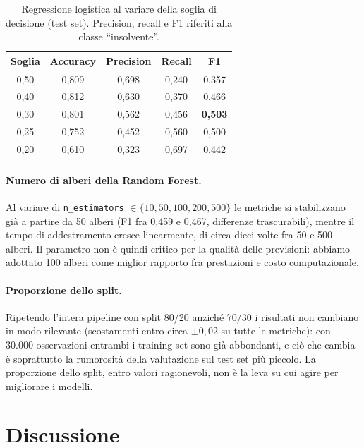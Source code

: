 \documentclass[11pt,a4paper]{article}
\begin{document}
\begin{table}[H]
\centering
\caption{Regressione logistica al variare della soglia di decisione (test set). Precision, recall e F1 riferiti alla classe ``insolvente''.}
\label{tab:soglie}
\begin{tabular}{ccccc}
\toprule
\textbf{Soglia} & \textbf{Accuracy} & \textbf{Precision} & \textbf{Recall} & \textbf{F1} \\
\midrule
0,50 & 0,809 & 0,698 & 0,240 & 0,357 \\
0,40 & 0,812 & 0,630 & 0,370 & 0,466 \\
0,30 & 0,801 & 0,562 & 0,456 & \textbf{0,503} \\
0,25 & 0,752 & 0,452 & 0,560 & 0,500 \\
0,20 & 0,610 & 0,323 & 0,697 & 0,442 \\
\bottomrule
\end{tabular}
\end{table}

\paragraph{Numero di alberi della Random Forest.} Al variare di \texttt{n\_estimators} $\in \{10, 50, 100, 200, 500\}$ le metriche si stabilizzano gi\`a a partire da 50 alberi (F1 fra 0,459 e 0,467, differenze trascurabili), mentre il tempo di addestramento cresce linearmente, di circa dieci volte fra 50 e 500 alberi. Il parametro non \`e quindi critico per la qualit\`a delle previsioni: abbiamo adottato 100 alberi come miglior rapporto fra prestazioni e costo computazionale.

\paragraph{Proporzione dello split.} Ripetendo l'intera pipeline con split 80/20 anzich\'e 70/30 i risultati non cambiano in modo rilevante (scostamenti entro circa $\pm 0{,}02$ su tutte le metriche): con 30.000 osservazioni entrambi i training set sono gi\`a abbondanti, e ci\`o che cambia \`e soprattutto la rumorosit\`a della valutazione sul test set pi\`u piccolo. La proporzione dello split, entro valori ragionevoli, non \`e la leva su cui agire per migliorare i modelli.

\section{Discussione}
\end{document}
